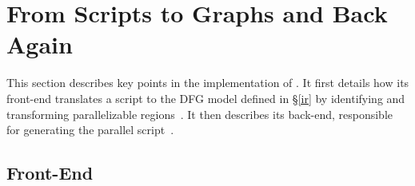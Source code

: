 \documentclass[letterpaper,twocolumn,10pt]{article}
\newcommand{\kk}[1]{[{\color{magenta}kk: #1}]}
\newcommand{\tr}[1]{} %
\begin{document}

\tr{If there is time I can work out a formal definition and a proof
  sketch why this transformation preserves the output of the dataflow
  graph.}




\section{From Scripts to Graphs and Back Again}
\label{impl}

This section describes key points in the implementation of \sys.
It first details how its front-end translates a script to the DFG model defined in \S\ref{ir} by identifying and transforming parallelizable regions~.
It then describes its back-end, responsible for generating the parallel script~.

\subsection{\sys Front-End}
\label{front-end}
\end{document}
